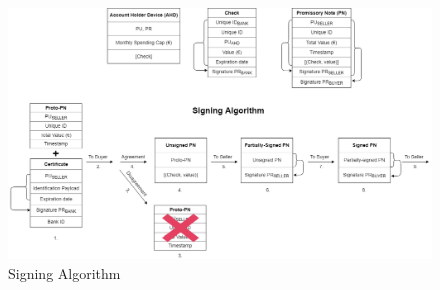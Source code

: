 \documentclass[12pt,a4paper]{article}
\begin{document}
    \begin{landscape}
    \thispagestyle{empty}
    
    	\begin{figure}
        	\centering
    	    \includegraphics[width=503pt]{img/signing_algorithm}
            \caption{Signing Algorithm}
            \label{fig:signing_algorithm}
    	\end{figure}
        
        \vfill
		\raisebox{1em}{\makebox[\linewidth]{\thepage}}
    \end{landscape}
	
\end{document}
